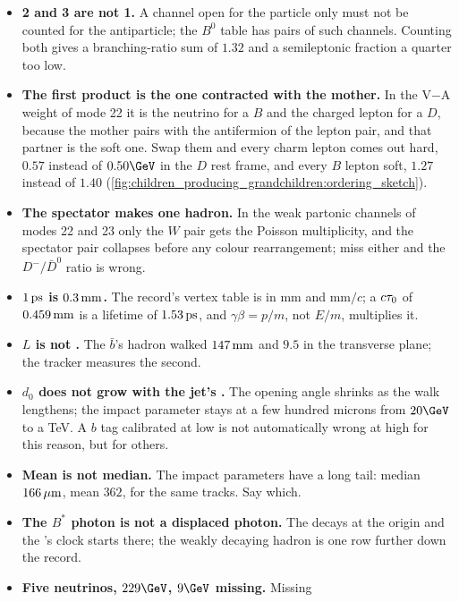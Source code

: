 \begin{pitfalls}
\begin{itemize}[nosep]
  \item \textbf{ 2 and 3 are not 1.} A channel open for the
    particle only must not be counted for the antiparticle; the $B^0$
    table has pairs of such channels. Counting both gives a branching-ratio
    sum of $1.32$ and a semileptonic fraction a quarter too low.
  \item \textbf{The first product is the one contracted with the mother.}
    In the V$-$A weight of mode 22 it is the neutrino for a $B$ and the
    charged lepton for a $D$, because the mother pairs with the
    antifermion of the lepton pair, and that partner is the soft one.
    Swap them and every charm lepton comes out hard, $0.57$ instead of
    $0.50\GeV$ in the $D$ rest frame, and every $B$ lepton soft, $1.27$
    instead of $1.40$
    (\cref{fig:children_producing_grandchildren:ordering_sketch}).
  \item \textbf{The spectator makes one hadron.} In the weak partonic
    channels of modes 22 and 23 only the $W$ pair gets the Poisson
    multiplicity, and the spectator pair collapses before any colour
    rearrangement; miss either and the $D^-/\bar D^0$ ratio is wrong.
  \item \textbf{$1\,\mathrm{ps}$ is $0.3\,\mathrm{mm}$.} The record's vertex table is in
    $\mathrm{mm}$ and $\mathrm{mm}/c$; a $c\tau_0$ of $0.459\,\mathrm{mm}$ is a
    lifetime of $1.53\,\mathrm{ps}$, and $\gamma\beta=p/m$, not $E/m$, multiplies it.
  \item \textbf{$L$ is not \Lxy.} The $\bar b$'s hadron walked $147\,\mathrm{mm}$
    and $9.5$ in the transverse plane; the tracker measures the second.
  \item \textbf{$d_0$ does not grow with the jet's \pt.} The opening angle
    shrinks as the walk lengthens; the impact parameter stays at a few
    hundred microns from $20\GeV$ to a TeV. A $b$ tag calibrated at low
    \pt is not automatically wrong at high \pt for this reason, but for
    others.
  \item \textbf{Mean is not median.} The impact parameters have a long
    tail: median $166\,\mu\mathrm{m}$, mean $362$, for the same tracks. Say which.
  \item \textbf{The $B^*$ photon is not a displaced photon.} The
    \Bstarbar decays at the origin and the \Bbar's clock starts there; the
    weakly decaying hadron is one row further down the record.
  \item \textbf{Five neutrinos, $229\GeV$, $9\GeV$ missing.} Missing

\end{itemize}
\end{pitfalls}
